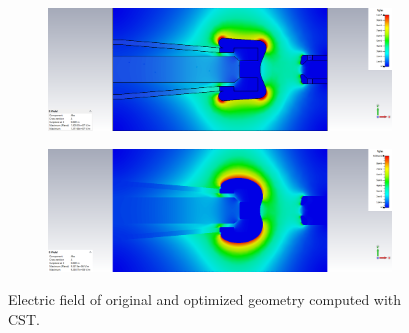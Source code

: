 \begin{center}
\begin{figure}[H]
    \begin{subfigure}{0.45\textwidth}
        \includegraphics[width=\textwidth]{fig/png/E_init_cst}
    \end{subfigure}
    \begin{subfigure}{0.45\textwidth}
        \includegraphics[width=\textwidth]{fig/png/E_opt_order=8_cst}
    \end{subfigure}
    \caption{Electric field of original and optimized geometry computed with CST.}
    \label{fig:E_cst}
\end{figure}
\end{center}

